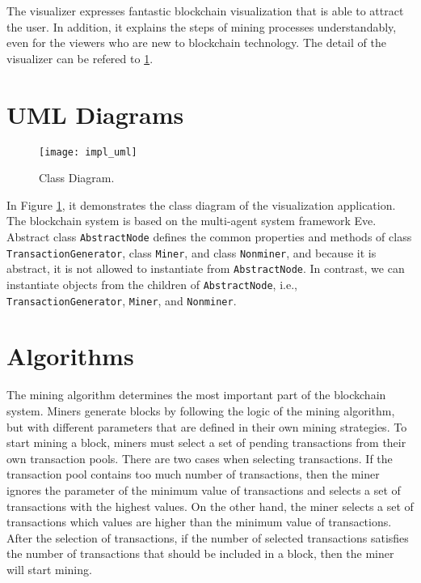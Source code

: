 The visualizer expresses fantastic blockchain visualization that is able to attract the user. In addition, it explains the steps of mining processes understandably, even for the viewers who are new to blockchain technology. The detail of the visualizer can be refered to \ref{}.

\section{UML Diagrams}

\begin{figure}[htb]
    \centering
    \texttt{[image: impl\_uml]}
    \caption{Class Diagram.}
    \label{fig:class diagram}
\end{figure}

In Figure \ref{fig:class diagram}, it demonstrates the class diagram of the visualization application. The blockchain system is based on the multi-agent system framework Eve. Abstract class \texttt{AbstractNode} defines the common properties and methods of class \texttt{TransactionGenerator}, class \texttt{Miner}, and class \texttt{Nonminer}, and because it is abstract, it is not allowed to instantiate from \texttt{AbstractNode}. In contrast, we can instantiate objects from the children of \texttt{AbstractNode}, i.e., \texttt{TransactionGenerator}, \texttt{Miner}, and \texttt{Nonminer}.

\section{Algorithms}
\label{algorithms}

The mining algorithm determines the most important part of the blockchain system. Miners generate blocks by following the logic of the mining algorithm, but with different parameters that are defined in their own mining strategies. To start mining a block, miners must select a set of pending transactions from their own transaction pools. There are two cases when selecting transactions. If the transaction pool contains too much number of transactions, then the miner ignores the parameter of the minimum value of transactions and selects a set of transactions with the highest values. On the other hand, the miner selects a set of transactions which values are higher than the minimum value of transactions. After the selection of transactions, if the number of selected transactions satisfies the number of transactions that should be included in a block, then the miner will start mining.

